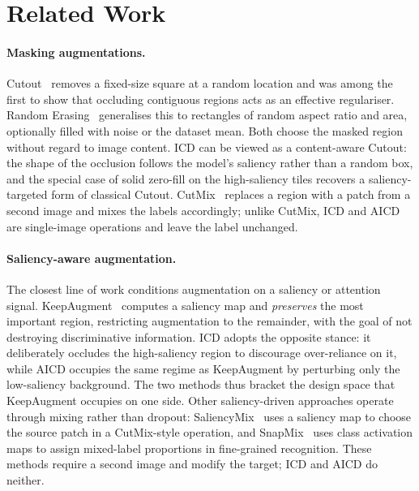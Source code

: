 \section{Related Work}
\label{sec:related}

\paragraph{Masking augmentations.}
Cutout~\citep{devries2017cutout} removes a fixed-size square at a random
location and was among the first to show that occluding contiguous regions acts
as an effective regulariser.  Random Erasing~\citep{zhong2020randomerasing}
generalises this to rectangles of random aspect ratio and area, optionally
filled with noise or the dataset mean.  Both choose the masked region without
regard to image content.  ICD can be viewed as a content-aware Cutout: the
shape of the occlusion follows the model's saliency rather than a random box,
and the special case of solid zero-fill on the high-saliency tiles recovers a
saliency-targeted form of classical Cutout.  CutMix~\citep{yun2019cutmix}
replaces a region with a patch from a second image and mixes the labels
accordingly; unlike CutMix, ICD and AICD are single-image operations and leave
the label unchanged.

\paragraph{Saliency-aware augmentation.}
The closest line of work conditions augmentation on a saliency or attention
signal.  KeepAugment~\citep{gong2021keepaugment} computes a saliency map and
\emph{preserves} the most important region, restricting augmentation to the
remainder, with the goal of not destroying discriminative information.  ICD
adopts the opposite stance: it deliberately occludes the high-saliency region
to discourage over-reliance on it, while AICD occupies the same regime as
KeepAugment by perturbing only the low-saliency background.  The two methods
thus bracket the design space that KeepAugment occupies on one side.  Other
saliency-driven approaches operate through mixing rather than dropout:
SaliencyMix~\citep{uddin2021saliencymix} uses a saliency map to choose the
source patch in a CutMix-style operation, and SnapMix~\citep{huang2021snapmix}
uses class activation maps to assign mixed-label proportions in fine-grained
recognition.  These methods require a second image and modify the target;
ICD and AICD do neither.

